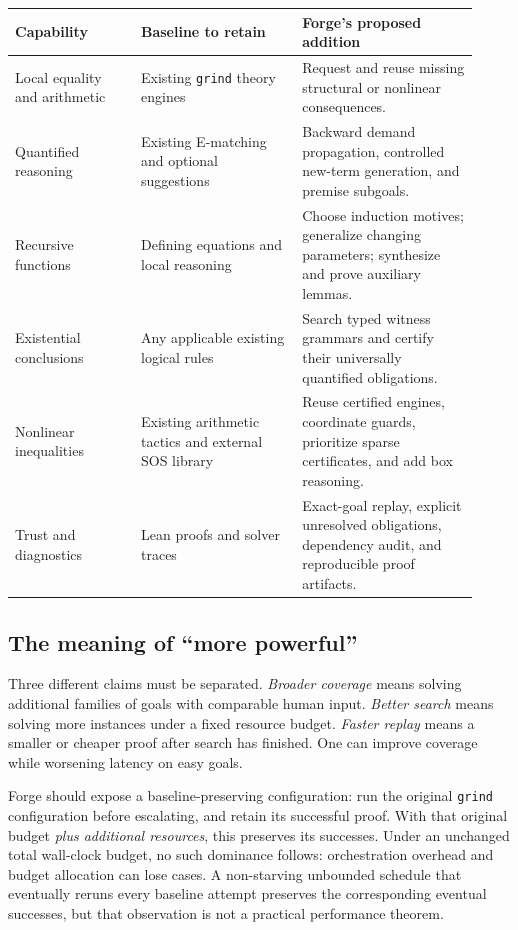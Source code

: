 \documentclass[11pt,a4paper]{article}
\newcommand{\code}[1]{\texttt{#1}}
\begin{document}
\begin{longtable}{p{0.25\linewidth}p{0.32\linewidth}p{0.35\linewidth}}
\toprule
Capability & Baseline to retain & Forge's proposed addition \\
\midrule
\endhead
Local equality and arithmetic & Existing \code{grind} theory engines & Request and reuse missing structural or nonlinear consequences. \\
Quantified reasoning & Existing E-matching and optional suggestions & Backward demand propagation, controlled new-term generation, and premise subgoals. \\
Recursive functions & Defining equations and local reasoning & Choose induction motives; generalize changing parameters; synthesize and prove auxiliary lemmas. \\
Existential conclusions & Any applicable existing logical rules & Search typed witness grammars and certify their universally quantified obligations. \\
Nonlinear inequalities & Existing arithmetic tactics and external SOS library & Reuse certified engines, coordinate guards, prioritize sparse certificates, and add box reasoning. \\
Trust and diagnostics & Lean proofs and solver traces & Exact-goal replay, explicit unresolved obligations, dependency audit, and reproducible proof artifacts. \\
\bottomrule
\end{longtable}

\subsection{The meaning of ``more powerful''}
Three different claims must be separated. \emph{Broader coverage} means solving
additional families of goals with comparable human input. \emph{Better search}
means solving more instances under a fixed resource budget. \emph{Faster replay}
means a smaller or cheaper proof after search has finished. One can improve
coverage while worsening latency on easy goals.

Forge should expose a baseline-preserving configuration: run the original
\code{grind} configuration before escalating, and retain its successful proof.
With that original budget \emph{plus additional resources}, this preserves
its successes. Under an unchanged total wall-clock budget, no such dominance
follows: orchestration overhead and budget allocation can lose cases. A
non-starving unbounded schedule that eventually reruns every baseline attempt
preserves the corresponding eventual successes, but that observation is not a
practical performance theorem.
\end{document}
